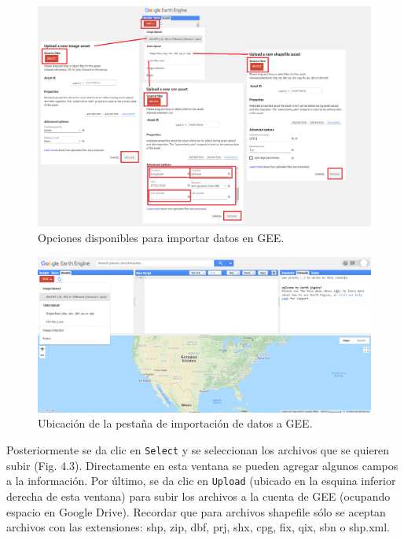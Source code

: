 \documentclass[
  12pt,
  letterpaper,
  twoside]{book}
\begin{document}
\begin{figure}[btp]

{\centering \includegraphics[width=1\linewidth]{Img/newAssets} 

}

\caption{Opciones disponibles para importar datos en GEE.}\label{fig:unnamed-chunk-36}
\end{figure}

\begin{figure}[btp]

{\centering \includegraphics[width=1\linewidth]{Img/Asset1} 

}

\caption{Ubicación de la pestaña de importación de datos a GEE.}\label{fig:unnamed-chunk-37}
\end{figure}

Posteriormente se da clic en \texttt{Select} y se seleccionan los archivos que se quieren subir (Fig. 4.3). Directamente en esta ventana se pueden agregar algunos campos a la información. Por último, se da clic en \texttt{Upload} (ubicado en la esquina inferior derecha de esta ventana) para subir los archivos a la cuenta de GEE (ocupando espacio en Google Drive). Recordar que para archivos shapefile sólo se aceptan archivos con las extensiones: shp, zip, dbf, prj, shx, cpg, fix, qix, sbn o shp.xml.
\end{document}
